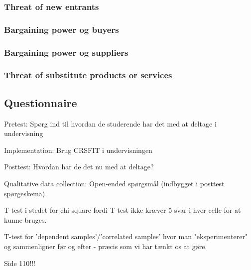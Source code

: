  


 
\subsubsection{Threat of new entrants}
\subsubsection{Bargaining power og buyers}
\subsubsection{Bargaining power og suppliers}
\subsubsection{Threat of substitute products or services}
















\subsection{Questionnaire} %

Pretest:
Spørg ind til hvordan de studerende har det med at deltage i undervisning

Implementation:
Brug CRSFIT i undervisningen

Posttest:
Hvordan har de det nu med at deltage?

Qualitative data collection:
Open-ended spørgsmål (indbygget i posttest spørgeskema)

T-test i stedet for chi-square fordi T-test ikke kræver 5 svar i hver celle for at kunne bruges.

T-test for 'dependent samples'/'correlated samples' hvor man "eksperimenterer" og sammenligner før og efter - præcis som vi har tænkt os at gøre.

Side 110!!!

